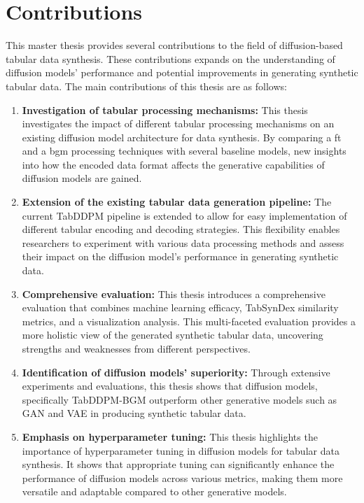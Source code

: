 \section{Contributions}
\label{ch:intro-contributions}
This master thesis provides several contributions to the field of diffusion-based tabular data synthesis. 
These contributions expands on the understanding of diffusion models' performance and potential improvements in generating synthetic tabular data. 
The main contributions of this thesis are as follows:
\begin{enumerate}
    \item \textbf{Investigation of tabular processing mechanisms:}
    This thesis investigates the impact of different tabular processing mechanisms on an existing diffusion model architecture for data synthesis. 
    By comparing a \gls{ft} and a \gls{bgm} processing techniques with several baseline models, new insights into how the encoded data format affects the generative capabilities of diffusion models are gained.
    \item \textbf{Extension of the existing tabular data generation pipeline:} 
    The current TabDDPM \cite{kotelnikov2022TabDDPMModellingTabular} pipeline is extended to allow for easy implementation of different tabular encoding and decoding strategies. 
    This flexibility enables researchers to experiment with various data processing methods and assess their impact on the diffusion model's performance in generating synthetic data.
    \item \textbf{Comprehensive evaluation:} 
    This thesis introduces a comprehensive evaluation that combines machine learning efficacy, 
    TabSynDex similarity metrics, and a visualization analysis. 
    This multi-faceted evaluation provides a more holistic view of the generated synthetic tabular data, 
    uncovering strengths and weaknesses from different perspectives.
    \item \textbf{Identification of diffusion models' superiority:} 
    Through extensive experiments and evaluations, this thesis shows that diffusion models, specifically TabDDPM-BGM outperform other generative models such as GAN and VAE in producing synthetic tabular data. 
    \item \textbf{Emphasis on hyperparameter tuning:} 
    This thesis highlights the importance of hyperparameter tuning in diffusion models for tabular data synthesis. 
    It shows that appropriate tuning can significantly enhance the performance of diffusion models across various metrics, 
    making them more versatile and adaptable compared to other generative models.
\end{enumerate}


